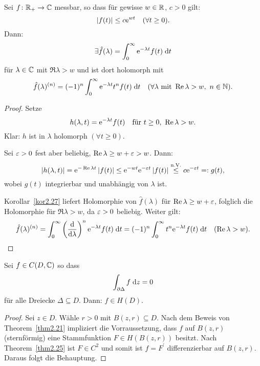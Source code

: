 \documentclass[a4paper,twoside,DIV15,BCOR12mm]{scrbook}
\begin{document}
\begin{bsp}[Laplacetransformation]\label{bsp2.28}
Sei $f\colon\mathbb{R}_+\rightarrow\mathbb{C}$ messbar, so dass für gewisse $w\in\mathbb{R}$, $c>0$ gilt:
\[\left\lvert f(t)\right\lvert\leq c\mathrm{e}^{wt}\quad(\forall t\geq 0).\]
Dann:
\[\exists\hat{f}(\lambda)=\int_{0}^{\infty}{\mathrm{e}^{-\lambda t}f(t)}\;\mathrm{d} t\]
für $\lambda\in\mathbb{C}$ mit $\Re{\lambda}>w$ und ist dort holomorph mit
\[\hat{f}(\lambda)^{(n)}=(-1)^n\integral{0}{\infty}{\e^{-\lambda t}t^n f(t)}{t}\quad(\forall\lambda\text{ mit }\Re{\lambda}>w,\ \nat{n}).\]

\begin{proof} Setze
\[h(\lambda, t)=\e^{-\lambda t}f(t)\quad\text{für }t\geq 0,\ \Re{\lambda}>w.\]
Klar: $h$ ist in $\lambda$ holomorph $(\forall t\geq 0)$.

Sei $\varepsilon >0$ fest aber beliebig, $\operatorname{Re}{\lambda}\geq w+\varepsilon > w$. Dann:
\[\left\lvert h(\lambda,t)\right\lvert=\mathrm{e}^{-\operatorname{Re}{\lambda}t}\left\lvert f(t)\right\lvert\leq\mathrm{e}^{-wt}\mathrm{e}^{-\varepsilon t}\left\lvert f(t)\right\lvert\overset{\text{n.V.}}{\leq}c\mathrm{e}^{-\varepsilon t}=: g(t),\]
wobei $g(t)$ integrierbar und unabhängig von $\lambda$ ist.

Korollar~\ref{kor2.27} liefert Holomorphie von $\hat{f}(\lambda)$ für $\operatorname{Re}{\lambda}\geq w+\varepsilon$, folglich die Holomorphie für $\Re{\lambda}>w$, da $\varepsilon>0$ beliebig. Weiter gilt:
\[\hat{f}(\lambda)^{(n)}=\int_{0}^{\infty}{\left(\frac{\mathrm{d}}{\mathrm{d}\lambda}\right)^n\mathrm{e}^{-\lambda t}f(t)}\;\mathrm{d} t=(-1)^n\int_{0}^{\infty}{t^n\mathrm{e}^{-\lambda t}f(t)}\;\mathrm{d} t\quad(\operatorname{Re}{\lambda}>w).\qedhere\]
\end{proof}
\end{bsp}

\begin{kor}[Morera]\label{kor2.29}
Sei $f\in C(D,\mathbb{C})$ so dass
\[\int_{\partial\Delta}^{}{f}\;\mathrm{d} z=0\]
für alle Dreiecke $\Delta\subseteq D$. Dann: $f\in H(D)$.
\end{kor}

\begin{proof} Sei $z\in D$. Wähle $r>0$ mit $B(z,r)\subseteq D$. Nach dem Beweis von Theorem~\ref{thm2.21} impliziert die Vorraussetzung, dass $f$ auf $B(z,r)$ (sternförmig) eine Stammfunktion $F\in H(B(z,r))$ besitzt. Nach Theorem~\ref{thm2.25} ist $F\in C^2$ und somit ist $f=F^\prime$ differenzierbar auf $B(z,r)$. Daraus folgt die Behauptung.
\end{proof}
\end{document}
